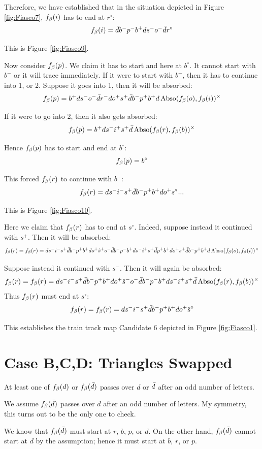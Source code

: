 Therefore, we have established that in the situation depicted in Figure \ref{fig:Fiasco7}, $f_\beta(i)$ has to end at $r^\circ$:
\[
f_\beta(i) = \bar{d} b^- p^- b^+ d s^- o^- \bar{d} r^\circ
\]

This is Figure \ref{fig:Fiasco9}.

Now consider $f_\beta(p)$. We claim it has to start and here at $b^\circ$. It cannot start with $b^-$ or it will trace immediately. If it were to start with $b^+$, then it has to continue into 1, or 2. Suppose it goes into 1, then it will be absorbed:
\[
f_\beta(p) = b^+ d s^- o^- \bar{d} r^- d o^+ s^+ \bar{d} b^- p^+ b^+ d \operatorname{Abso}(f_\beta(o), f_\beta(i))^\times
\]

If it were to go into 2, then it also gets absorbed:
\[
f_\beta(p) = b^+ d s^- i^+ s^+ \bar{d} \operatorname{Abso}(f_\beta(r), f_\beta(b))^\times
\]

Hence $f_\beta(p)$ has to start and end at $b^\circ$:
\[
f_\beta(p) = b^\circ
\]

This forced $f_\beta(r)$ to continue with $b^-$:
\[
f_\beta(r) = d s^- i^- s^+ \bar{d} b^- p^+ b^+ d o^+ s^*...
\]

This is Figure \ref{fig:Fiasco10}.

Here we claim that $f_\beta(r)$ has to end at $s^\circ$. Indeed, suppose instead it continued with $s^+$. Then it will be absorbed:
\[
f_\beta(r) = f_\beta(r) = d s^- i^- s^+ \bar{d} b^- p^+ b^+ d o^+ \hat{s}^+ o^- \bar{d} b^- p^- b^+ d s^- i^+ s^+ \bar{d} p^+ b^+ d o^+ s^+ \bar{d} b^- p^+ b^+ d \operatorname{Abso}(f_\beta(o), f_\beta(i))^\times
\]

Suppose instead it continued with $s^-$. Then it will again be absorbed:
\[
f_\beta(r) = f_\beta(r) = d s^- i^- s^+ \bar{d} b^- p^+ b^+ d o^+ \hat{s}^- o^- \bar{d} b^- p^- b^+ d s^- i^+ s^+ \bar{d} \operatorname{Abso}(f_\beta(r), f_\beta(b))^\times
\]
Thus $f_\beta(r)$ must end at $s^\circ$:
\[
f_\beta(r) = f_\beta(r) = d s^- i^- s^+ \bar{d} b^- p^+ b^+ d o^+ \hat{s}^\circ
\]

This establishes the train track map Candidate 6 depicted in Figure \ref{fig:Fiasco1}.

\section{Case B,C,D: Triangles Swapped} \label{CaseBCD}

At least one of $f_\beta(d)$ or $f_\beta(\bar{d})$ passes over $d$ or $\bar{d}$ after an odd number of letters.

We assume $f_\beta(\bar{d})$ passes over $d$ after an odd number of letters. My symmetry, this turns out to be the only one to check.

We know that $f_\beta(\bar{d})$ must start at $r$, $b$, $p$, or $d$. On the other hand, $f_\beta(\bar{d})$ cannot start at $d$ by the assumption; hence it must start at $b$, $r$, or $p$.

